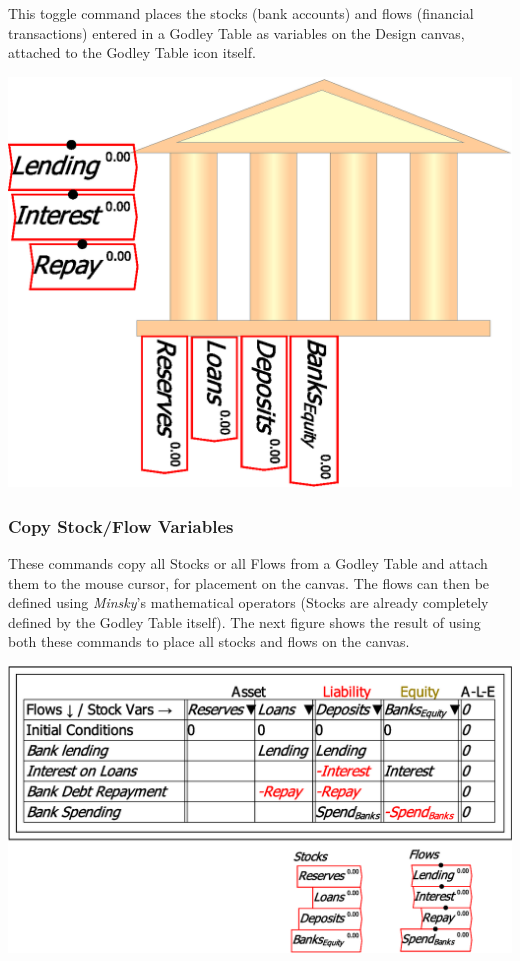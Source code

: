 This toggle command places the stocks (bank accounts) and flows (financial
transactions) entered in a Godley Table as variables on the Design
canvas, attached to the Godley Table icon itself.

\includegraphics{images/GodleyTableIconModeShowVariables}

\subsubsection{Copy Stock/Flow Variables}

These commands copy all Stocks or all Flows from a Godley Table and
attach them to the mouse cursor, for placement on the canvas. The
flows can then be defined using \emph{Minsky}'s mathematical operators
(Stocks are already completely defined by the Godley Table itself).
The next figure shows the result of using both these commands to place
all stocks and flows on the canvas.

\includegraphics{images/GodleyTableImagesStocksFlowsOnCanvas}

